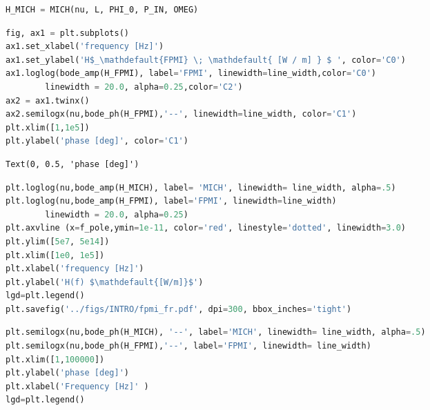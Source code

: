 \begin{spacing}{1.2} \begin{lstlisting}[frame=single, language=Python]
H_MICH = MICH(nu, L, PHI_0, P_IN, OMEG)
\end{lstlisting} \end{spacing}

\begin{spacing}{1.2} \begin{lstlisting}[frame=single, language=Python]
fig, ax1 = plt.subplots()
ax1.set_xlabel('frequency [Hz]')
ax1.set_ylabel('H$_\mathdefault{FPMI} \; \mathdefault{ [W / m] } $ ', color='C0')
ax1.loglog(bode_amp(H_FPMI), label='FPMI', linewidth=line_width,color='C0')
	    linewidth = 20.0, alpha=0.25,color='C2')
ax2 = ax1.twinx()
ax2.semilogx(nu,bode_ph(H_FPMI),'--', linewidth=line_width, color='C1')
plt.xlim([1,1e5])
plt.ylabel('phase [deg]', color='C1')
\end{lstlisting} \end{spacing}

\begin{spacing}{1.2} \begin{lstlisting}
Text(0, 0.5, 'phase [deg]')
\end{lstlisting} \end{spacing}

\begin{spacing}{1.2} \begin{lstlisting}[frame=single, language=Python]
plt.loglog(nu,bode_amp(H_MICH), label= 'MICH', linewidth= line_width, alpha=.5)
plt.loglog(nu,bode_amp(H_FPMI), label='FPMI', linewidth=line_width)
	    linewidth = 20.0, alpha=0.25)
plt.axvline (x=f_pole,ymin=1e-11, color='red', linestyle='dotted', linewidth=3.0)
plt.ylim([5e7, 5e14])
plt.xlim([1e0, 1e5])
plt.xlabel('frequency [Hz]')
plt.ylabel('H(f) $\mathdefault{[W/m]}$')
lgd=plt.legend()
plt.savefig('../figs/INTRO/fpmi_fr.pdf', dpi=300, bbox_inches='tight')
\end{lstlisting} \end{spacing}

\begin{spacing}{1.2} \begin{lstlisting}[frame=single, language=Python]
plt.semilogx(nu,bode_ph(H_MICH), '--', label='MICH', linewidth= line_width, alpha=.5)
plt.semilogx(nu,bode_ph(H_FPMI),'--', label='FPMI', linewidth= line_width)
plt.xlim([1,100000])
plt.ylabel('phase [deg]')
plt.xlabel('Frequency [Hz]' )
lgd=plt.legend()
\end{lstlisting} \end{spacing}

